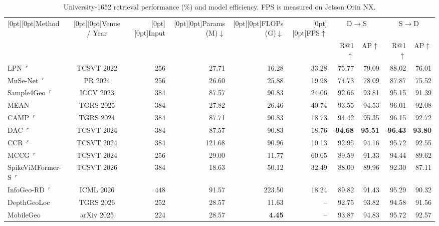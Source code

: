 \begin{table}[t]
\centering
\caption{University-1652 retrieval performance (\%) and model efficiency. FPS is measured on Jetson Orin NX.}
\label{tab:university}
\footnotesize
\setlength{\tabcolsep}{3pt}
\begin{tabular*}{\textwidth}{@{\extracolsep{\fill}}lcrrrrrrrr@{}}
\toprule
\raisebox{-4.5pt}[0pt][0pt]{Method} & \raisebox{-4.5pt}[0pt][0pt]{Venue / Year} & \raisebox{-4.5pt}[0pt][0pt]{Input} & \raisebox{-4.5pt}[0pt][0pt]{Params (M)$\downarrow$} & \raisebox{-4.5pt}[0pt][0pt]{FLOPs (G)$\downarrow$} & \raisebox{-4.5pt}[0pt][0pt]{FPS$\uparrow$} & \multicolumn{2}{c}{D$\rightarrow$S} & \multicolumn{2}{c}{S$\rightarrow$D} \\
 & & & & & & R@1$\uparrow$ & AP$\uparrow$ & R@1$\uparrow$ & AP$\uparrow$ \\
\midrule
LPN~\cite{wang2022lpn}$^{r}$ & TCSVT 2022 & 256 & 27.71 & 16.28 & 33.28 & 75.77 & 79.09 & 88.02 & 76.01 \\
MuSe-Net~\cite{wang2024musenet}$^{r}$ & PR 2024 & 256 & 26.60 & 25.88 & 19.98 & 74.73 & 78.09 & 87.87 & 75.52 \\
Sample4Geo~\cite{deuser2023sample4geo}$^{r}$ & ICCV 2023 & 384 & 87.57 & 90.83 & 24.06 & 92.66 & 93.81 & 95.15 & 91.39 \\
MEAN~\cite{chen2025mean} & TGRS 2025 & 384 & 27.82 & 26.46 & 40.74 & 93.55 & 94.53 & 96.01 & 92.08 \\
CAMP~\cite{wu2024camp}$^{r}$ & TGRS 2024 & 384 & 87.71 & 90.83 & 18.73 & 94.42 & 95.35 & 96.15 & 92.72 \\
DAC~\cite{xia2024dac}$^{r}$ & TCSVT 2024 & 384 & 87.57 & 90.83 & 18.76 & \textbf{94.68} & \textbf{95.51} & \textbf{96.43} & \textbf{93.80} \\
CCR~\cite{du2024ccr}$^{r}$ & TCSVT 2024 & 384 & 121.68 & 90.96 & 10.13 & 92.95 & 94.16 & 95.72 & 92.55 \\
MCCG~\cite{shen2024mccg}$^{r}$ & TCSVT 2024 & 256 & 29.00 & 11.77 & 60.05 & 89.59 & 91.33 & 94.44 & 89.62 \\
SpikeViMFormer-S~\cite{chen2026spikevimformer}$^{r}$ & TCSVT 2026 & 384 & 18.63 & 50.12 & 32.49 & 88.00 & 89.96 & 92.30 & 87.11 \\
InfoGeo-RD~\cite{zhang2026infogeo}$^{r}$ & ICML 2026 & 448 & 91.57 & 223.50 & 18.24 & 89.82 & 91.43 & 95.29 & 90.32 \\
DepthGeoLoc~\cite{sun2026depthgeoloc} & TGRS 2026 & 252 & 28.57 & 11.63 & -- & 92.75 & 93.82 & 94.58 & 91.56 \\
MobileGeo~\cite{sun2025mobilegeo} & arXiv 2025 & 224 & 28.57 & \textbf{4.45} & -- & 93.87 & 94.83 & 95.72 & 92.57 \\

\end{tabular*}
\end{table}

